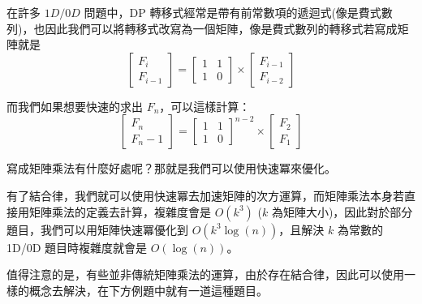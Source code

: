 \documentclass[main.tex]{subfiles}
\begin{document}
    在許多 $1D/0D$ 問題中，DP 轉移式經常是帶有前常數項的遞迴式(像是費式數列)，也因此我們可以將轉移式改寫為一個矩陣，像是費式數列的轉移式若寫成矩陣就是
    $$\begin{bmatrix}
        F_i \\
        F_{i-1}
    \end{bmatrix} = 
    \begin{bmatrix}
    1 & 1 \\
    1 & 0
    \end{bmatrix} \times
    \begin{bmatrix}
    F_{i-1} \\
    F_{i-2}
    \end{bmatrix}
    $$
    
    而我們如果想要快速的求出 $F_n$，可以這樣計算：
    $$\begin{bmatrix}
    F_n \\
    F_n-1
    \end{bmatrix} = 
    \begin{bmatrix}
    1 & 1 \\
    1 & 0
    \end{bmatrix}^{n-2} \times
    \begin{bmatrix}
    F_2 \\
    F_1
    \end{bmatrix}$$
    
    寫成矩陣乘法有什麼好處呢？那就是我們可以使用快速冪來優化。
    
    
    有了結合律，我們就可以使用快速冪去加速矩陣的次方運算，而矩陣乘法本身若直接用矩陣乘法的定義去計算，複雜度會是 $O(k^3)$ ($k$ 為矩陣大小)，因此對於部分題目，我們可以用矩陣快速冪優化到 $O(k^3 \log(n))$，且解決 $k$ 為常數的 1D/0D 題目時複雜度就會是 $O(\log(n))$。
    
    值得注意的是，有些並非傳統矩陣乘法的運算，由於存在結合律，因此可以使用一樣的概念去解決，在下方例題中就有一道這種題目。
    
\end{document}

